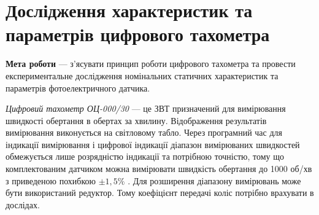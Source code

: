 \newpage\BorderFirstPage
\chapter[~]{Дослідження характеристик та параметрів цифрового тахометра}

\textbf{Мета роботи} ---  з’ясувати принцип роботи цифрового тахометра та провести експериментальне
дослідження номінальних статичних характеристик та параметрів фотоелектричного датчика.


\textit{Цифровий тахометр ОЦ-000/30} --- це ЗВТ призначений для вимірювання швидкості обертання в обертах за
хвилину.  Відображення результатів вимірювання виконується на світловому табло.  Через програмний
час для індикації вимірювання і цифрової індикації діапазон вимірюваних швидкостей обмежується лише
розрядністю індикації та потрібною точністю, тому що комплектованим датчиком можна вимірювати
швидкість обертання до 1000 об/хв з приведеною похибкою $\pm1,5\%$ . Для розширення діапазону
вимірювань може бути використаний редуктор. Тому коефіцієнт передачі коліс потрібно врахувати в
дослідах.

